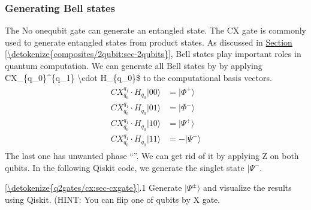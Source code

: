 \documentclass[letterpaper,10pt,english]{jupyterBook}
\begin{document}
\subsubsection{Generating Bell states}
\label{\detokenize{q2gates/cx:generating-bell-states}}
\sphinxAtStartPar
The
No one\sphinxhyphen{}qubit gate can generate an entangled state.  The CX gate is commonly used to generate entangled states from product states.  As discussed in \hyperref[\detokenize{composites/2qubit:sec-2qubits}]{Section \ref{\detokenize{composites/2qubit:sec-2qubits}}}, Bell states play important roles in quantum computation. We can generate all Bell states by by applying CX\_\{q\_0\}\textasciicircum{}\{q\_1\} \textbackslash{}cdot H\_\{q\_0\}\$ to the computational basis vectors.
\begin{equation}\label{equation:q2gates/cx:cbase-Bell}
\begin{split}
\begin{align}
CX_{q_0}^{q_1} \cdot H_{q_0} |00\rangle &= |\Phi^{+}\rangle \\
CX_{q_0}^{q_1} \cdot H_{q_0} |01\rangle &= |\Phi^{-}\rangle \\
CX_{q_0}^{q_1} \cdot H_{q_0} |10\rangle &= |\Psi^{+}\rangle \\
CX_{q_0}^{q_1} \cdot H_{q_0} |11\rangle &= -|\Psi^{-}\rangle
\end{align}
\end{split}
\end{equation}
\sphinxAtStartPar
The last one has unwanted phase “\sphinxhyphen{}”.  We can get rid of it by applying Z on both qubits.  In the following Qiskit code, we generate the singlet state \(|\Psi^{-}\).

\sphinxAtStartPar
{}  \hyperref[\detokenize{q2gates/cx:sec-cxgate}]{\ref{\detokenize{q2gates/cx:sec-cxgate}}}.1  Generate \(|\Psi^{\pm}\rangle\) and visualize the results using Qiskit. (HINT: You can flip one of qubits by X gate.
\end{document}
